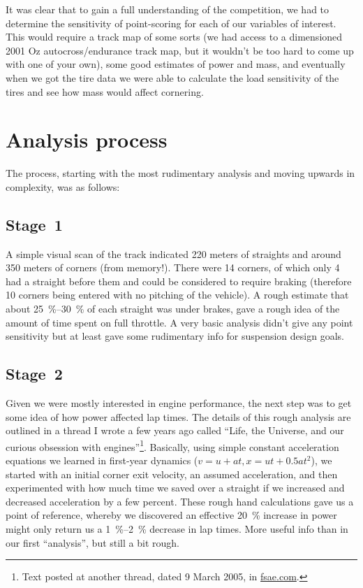 \documentclass[10pt, a4paper, article, oneside, twocolumn, final]{memoir}
\begin{document}
It was clear that to gain a full understanding of the competition, we had to determine the sensitivity of point-scoring for each of our variables of interest. This would require a track map of some sorts (we had access to a dimensioned 2001 Oz autocross/\allowbreak endurance track map, but it wouldn’t be too hard to come up with one of your own), some good estimates of power and mass, and eventually when we got the tire data we were able to calculate the load sensitivity of the tires and see how mass would affect cornering. 

\section*{Analysis process}

The process, starting with the most rudimentary analysis and moving upwards in complexity, was as follows: 

\subsection*{Stage~1}
A simple visual scan of the track indicated \num{220} meters of straights and around \num{350} meters of corners (from memory!). There were \num{14} corners, of which only \num{4} had a straight before them and could be considered to require braking (therefore \num{10} corners being entered with no pitching of the vehicle). A rough estimate that about \SIrange{25}{30}{\percent} of each straight was under brakes, gave a rough idea of the amount of time spent on full throttle. A very basic analysis didn’t give any point sensitivity but at least gave some rudimentary info for suspension design goals.

\subsection*{Stage~2}
Given we were mostly interested in engine performance, the next step was to get some idea of how power affected lap times. The details of this rough analysis are outlined in a thread I wrote a few years ago called “Life, the Universe, and our curious obsession with engines”\footnote{Text posted at another thread, dated 9 March 2005, in \href{http://www.fsae.com/forums/showthread.php?6536-Life-the-Universe-and-our-curious-obsession-with-engines}{fsae.com}.}. Basically, using simple constant acceleration equations we learned in first-year dynamics ($v = u + at, x = ut + \num{0.5}at^2$), we started with an initial corner exit velocity, an assumed acceleration, and then experimented with how much time we saved over a straight if we increased and decreased acceleration by a few percent. These rough hand calculations gave us a point of reference, whereby we discovered an effective \SI{20}{\percent} increase in power might only return us a \SIrange{1}{2}{\percent} decrease in lap times. More useful info than in our first “analysis”, but still a bit rough.
\end{document}
